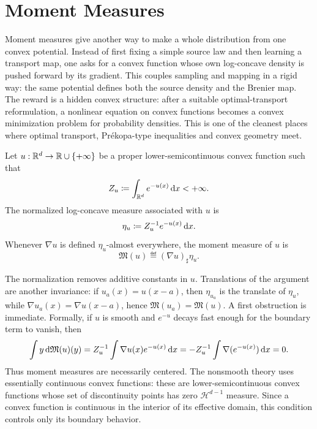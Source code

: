 \section{Moment Measures}
\label{sec-moment-measures}

Moment measures give another way to make a whole distribution from one convex potential. Instead of first fixing a simple source law and then learning a transport map, one asks for a convex function whose own log-concave density is pushed forward by its gradient. This couples sampling and mapping in a rigid way: the same potential defines both the source density and the Brenier map. The reward is a hidden convex structure: after a suitable optimal-transport reformulation, a nonlinear equation on convex functions becomes a convex minimization problem for probability densities. This is one of the cleanest places where optimal transport, Pr\'ekopa-type inequalities and convex geometry meet.

\begin{defn}\label{def-moment-measure}
	Let $u:\mathbb{R}^d\to\mathbb{R}\cup\{+\infty\}$ be a proper lower-semicontinuous convex function such that
	\[
		Z_u\coloneqq \int_{\mathbb{R}^d} e^{-u(x)}\,\mathrm{d} x <+\infty.
	\]
	The normalized log-concave measure associated with $u$ is
	\[
		\eta_u \coloneqq Z_u^{-1} e^{-u(x)}\,\mathrm{d} x.
	\]
	Whenever $\nabla u$ is defined $\eta_u$-almost everywhere, the moment measure of $u$ is
	\[
		\mathfrak M(u)\eqdef (\nabla u)_\sharp \eta_u.
	\]
\end{defn}

The normalization removes additive constants in $u$. Translations of the argument are another invariance: if $u_a(x)=u(x-a)$, then $\eta_{u_a}$ is the translate of $\eta_u$, while $\nabla u_a(x)=\nabla u(x-a)$, hence $\mathfrak M(u_a)=\mathfrak M(u)$. A first obstruction is immediate. Formally, if $u$ is smooth and $e^{-u}$ decays fast enough for the boundary term to vanish, then
\[
	\int y\,\mathrm{d}\mathfrak M(u)(y)
	=
	Z_u^{-1}\int \nabla u(x)e^{-u(x)}\,\mathrm{d} x
	=
	-Z_u^{-1}\int \nabla(e^{-u(x)})\,\mathrm{d} x
	=0.
\]
Thus moment measures are necessarily centered. The nonsmooth theory uses essentially continuous convex functions: these are lower-semicontinuous convex functions whose set of discontinuity points has zero $\mathcal H^{d-1}$ measure. Since a convex function is continuous in the interior of its effective domain, this condition controls only its boundary behavior.

